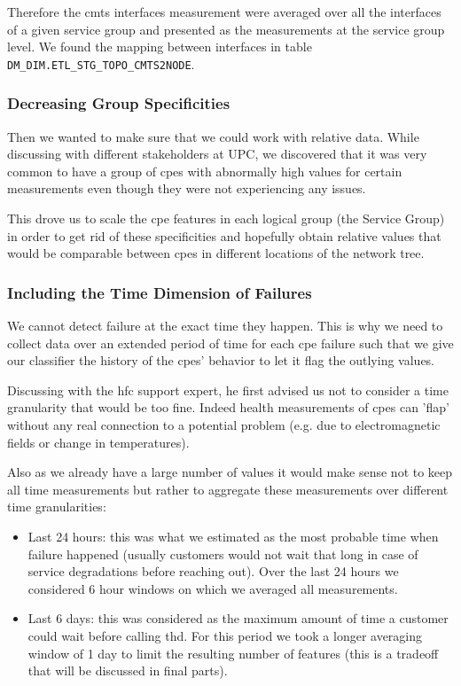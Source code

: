 Therefore the \acrshort{cmts} interfaces measurement were averaged over all the interfaces of a given service group and presented as the measurements at the service group level. We found the mapping between interfaces in table \texttt{DM\_DIM.ETL\_STG\_TOPO\_CMTS2NODE}.

\subsubsection{Decreasing Group Specificities}
Then we wanted to make sure that we could work with relative data. While discussing with different stakeholders at UPC, we discovered that it was very common to have a group of \acrshort{cpe}s with abnormally high values for certain measurements even though they were not experiencing any issues.

This drove us to scale the \acrshort{cpe} features in each logical group (the Service Group) in order to get rid of these specificities and hopefully obtain relative values that would be comparable between \acrshort{cpe}s in different locations of the network tree. 

\subsubsection{Including the Time Dimension of Failures}
\label{subsubsec:time_representation}
We cannot detect failure at the exact time they happen. This is why we need to collect data over an extended period of time for each \acrshort{cpe} failure such that we give our classifier the history of the \acrshort{cpe}s' behavior to let it flag the outlying values. 

Discussing with the \acrshort{hfc} support expert, he first advised us not to consider a time granularity that would be too fine. Indeed health measurements of \acrshort{cpe}s can 'flap' without any real connection to a potential problem (e.g. due to electromagnetic fields or change in temperatures). 

Also as we already have a large number of values it would make sense not to keep all time measurements but rather to aggregate these measurements over different time granularities:
\begin{itemize}
	\item Last 24 hours: this was what we estimated as the most probable time when failure happened (usually customers would not wait that long in case of service degradations before reaching out). Over the last 24 hours we considered 6 hour windows on which we averaged all measurements.
	\item Last 6 days: this was considered as the maximum amount of time a customer could wait before calling \acrshort{thd}. For this period we took a longer averaging window of 1 day to limit the resulting number of features (this is a tradeoff that will be discussed in final parts).
\end{itemize}

